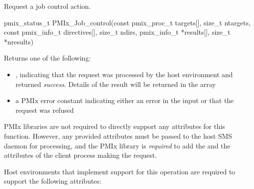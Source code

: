 \summary

Request a job control action.

\format

\cspecificstart
\begin{codepar}
pmix_status_t
PMIx_Job_control(const pmix_proc_t targets[], size_t ntargets,
                 const pmix_info_t directives[], size_t ndirs,
                 pmix_info_t *results[], size_t *nresults)
\end{codepar}
\cspecificend

\begin{arglist}
\end{arglist}

Returns one of the following:

\begin{itemize}
    \item {}, indicating that the request was processed by the host environment and returned \textit{success}. Details of the result will be returned in the  array
    \item a \ac{PMIx} error constant indicating either an error in the input or that the request was refused
\end{itemize}

\reqattrstart
\ac{PMIx} libraries are not required to directly support any attributes for this function. However, any provided attributes must be passed to the host \ac{SMS} daemon for processing, and the \ac{PMIx} library is \textit{required} to add the  and the  attributes of the client process making the request.

\divider

Host environments that implement support for this operation are required to support the following attributes:


